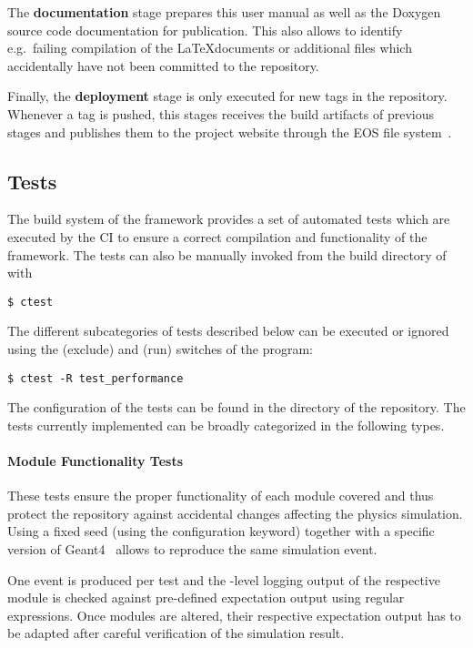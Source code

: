 The \textbf{documentation} stage prepares this user manual as well as the Doxygen source code documentation for publication.
This also allows to identify e.g.\ failing compilation of the \LaTeX documents or additional files which accidentally have not been committed to the repository.

Finally, the \textbf{deployment} stage is only executed for new tags in the repository.
Whenever a tag is pushed, this stages receives the build artifacts of previous stages and publishes them to the \apsq project website through the EOS file system~\cite{eos}.


\subsection{Tests}
\label{sec:tests}

The build system of the framework provides a set of automated tests which are executed by the CI to ensure a correct compilation and functionality of the framework.
The tests can also be manually invoked from the build directory of \apsq with
\begin{verbatim}
$ ctest
\end{verbatim}

The different subcategories of tests described below can be executed or ignored using the  (exclude) and  (run) switches of the  program:
\begin{verbatim}
$ ctest -R test_performance
\end{verbatim}

The configuration of the tests can be found in the  directory of the repository.
The tests currently implemented can be broadly categorized in the following types.

\paragraph{Module Functionality Tests}

These tests ensure the proper functionality of each module covered and thus protect the repository against accidental changes affecting the physics simulation.
Using a fixed seed (using the  configuration keyword) together with a specific version of Geant4~\cite{geant4} allows to reproduce the same simulation event.

One event is produced per test and the -level logging output of the respective module is checked against pre-defined expectation output using regular expressions.
Once modules are altered, their respective expectation output has to be adapted after careful verification of the simulation result.

